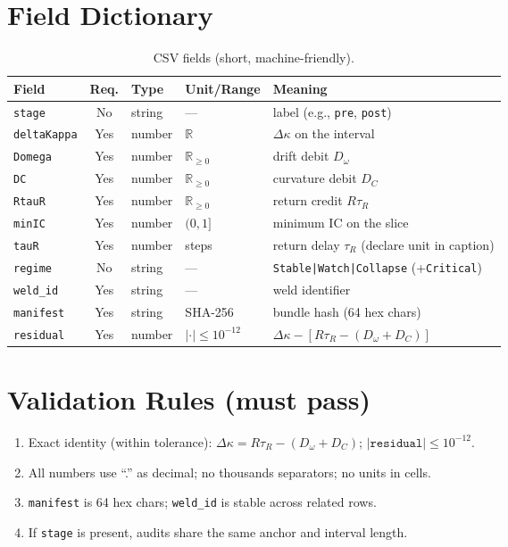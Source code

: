 \section{Field Dictionary}
\label{sec:csv-dict}
\begin{table}[h]
  \centering
  \caption{CSV fields (short, machine-friendly).}
  \label{tab:csv-fields}
  \footnotesize
  \begingroup\setlength{\tabcolsep}{5pt}
  \begin{tabularx}{\linewidth}{@{} l c l l >{\raggedright\arraybackslash}X @{}}
    \toprule
    Field & Req. & Type & Unit/Range & Meaning \\
    \midrule
    \texttt{stage} & No  & string & — & label (e.g., \texttt{pre}, \texttt{post}) \\
    \texttt{deltaKappa} & Yes & number & \(\mathbb{R}\) & \(\Delta\kappa\) on the interval \\
    \texttt{Domega} & Yes & number & \(\mathbb{R}_{\ge0}\) & drift debit \(D_{\omega}\) \\
    \texttt{DC} & Yes & number & \(\mathbb{R}_{\ge0}\) & curvature debit \(D_{C}\) \\
    \texttt{RtauR} & Yes & number & \(\mathbb{R}_{\ge0}\) & return credit \(R\tau_{R}\) \\
    \texttt{minIC} & Yes & number & \((0,1]\) & minimum IC on the slice \\
    \texttt{tauR} & Yes & number & steps & return delay \(\tau_{R}\) (declare unit in caption) \\
    \texttt{regime} & No  & string & — & \texttt{Stable|Watch|Collapse} (+\texttt{Critical}) \\
    \texttt{weld\_id} & Yes & string & — & weld identifier \\
    \texttt{manifest} & Yes & string & SHA-256 & bundle hash (64 hex chars) \\
    \texttt{residual} & Yes & number & \(|\cdot|\le 10^{-12}\) & \(\Delta\kappa-[R\tau_R-(D_{\omega}+D_C)]\) \\
    \bottomrule
  \end{tabularx}
  \endgroup
\end{table}

\section{Validation Rules (must pass)}
\label{sec:csv-rules}

\begin{enumerate}[leftmargin=1.25em]
  \item Exact identity (within tolerance): \(\Delta\kappa = R\tau_{R} - (D_{\omega}+D_{C})\); \(|\texttt{residual}|\le 10^{-12}\).
  \item All numbers use “.” as decimal; no thousands separators; no units in cells.
  \item \texttt{manifest} is 64 hex chars; \texttt{weld\_id} is stable across related rows.
  \item If \texttt{stage} is present, audits share the same anchor and interval length.
\end{enumerate}

